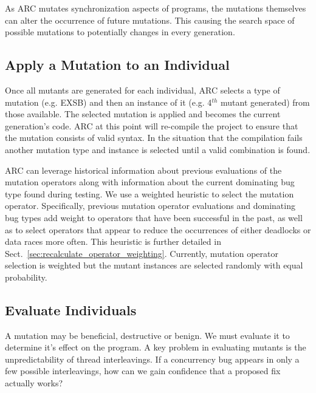 As ARC mutates synchronization aspects of programs, the mutations themselves
can alter the occurrence of future mutations. This causing the search space of
possible mutations to potentially changes in every generation.


\subsection{Apply a Mutation to an Individual}
\label{sec:mutate_individuals}

Once all mutants are generated for each individual, ARC selects a type of
mutation (e.g. EXSB) and then an instance of it (e.g. 4$^{th}$ mutant
generated) from those available. The selected mutation is applied and becomes
the current generation's code. ARC at this point will re-compile the project to
ensure that the mutation consists of valid syntax. In the situation that the
compilation fails another mutation type and instance is selected until a valid
combination is found.

ARC can leverage historical information about previous evaluations of the
mutation operators along with information about the current dominating bug type
found during testing. We use a weighted heuristic to select the mutation operator. Specifically, previous mutation operator evaluations and dominating bug types add weight to operators that
have been successful in the past, as well as to select operators that appear to
reduce the occurrences of either deadlocks or data races more often. This
heuristic is further detailed in
Sect.~\ref{sec:recalculate_operator_weighting}. Currently, mutation operator selection
is weighted but the mutant instances are selected randomly with equal
probability.

\subsection{Evaluate Individuals}
\label{sec:evalute_individuals}

A mutation may be beneficial, destructive or benign. We must evaluate it to
determine it's effect on the program. A key problem in evaluating mutants is the unpredictability of
thread interleavings. If a concurrency bug appears in only a few possible interleavings, how can we gain
confidence that a proposed fix actually works? 

